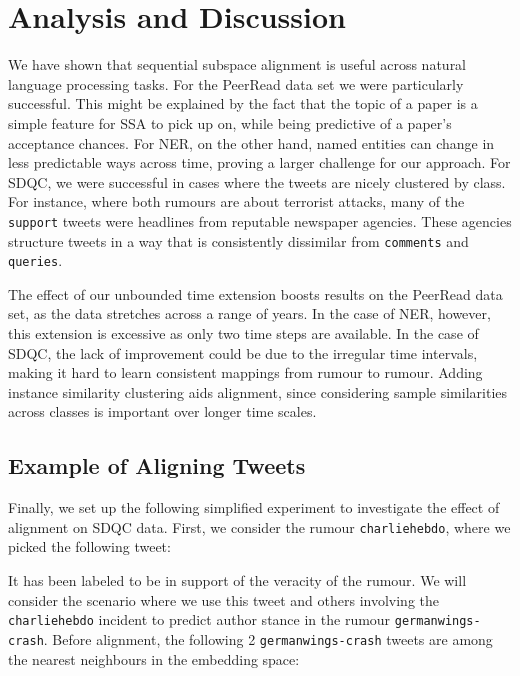 \documentclass[letterpaper]{article} %
\begin{document}
\section{Analysis and Discussion} \label{sec:discussion}
We have shown that sequential subspace alignment is useful across natural language processing tasks. %
For the PeerRead data set we were particularly successful. This might be explained by the fact that the topic of a paper is a simple feature for SSA to pick up on, while being predictive of a paper's acceptance chances.
For NER, on the other hand, named entities can change in less predictable ways across time, proving a larger challenge for our approach.
For SDQC, we were successful in cases where the tweets are nicely clustered by class. For instance, where both rumours are about terrorist attacks, many of the \texttt{support} tweets were headlines from reputable newspaper agencies. These agencies structure tweets in a way that is consistently dissimilar from \texttt{comments} and \texttt{queries}.

The effect of our unbounded time extension boosts results on the PeerRead data set, as the data stretches across a range of years.
In the case of NER, however, this extension is excessive as only two time steps are available.
In the case of SDQC, the lack of improvement could be due to the irregular time intervals, making it hard to learn consistent mappings from rumour to rumour.
Adding instance similarity clustering aids alignment, since considering sample similarities across classes is important over longer time scales.

\subsection{Example of Aligning Tweets}
Finally, we set up the following simplified experiment to investigate the effect of alignment on SDQC data. First, we consider the rumour \texttt{charliehebdo}, where we picked the following tweet:

\noindent {}

\noindent It has been labeled to be in support of the veracity of the rumour. We will consider the scenario where we use this tweet and others involving the \texttt{charliehebdo} incident to predict author stance in the rumour \texttt{germanwings-crash}. Before alignment, the following 2 \texttt{germanwings-crash} tweets are among the nearest neighbours in the embedding space:
\end{document}
